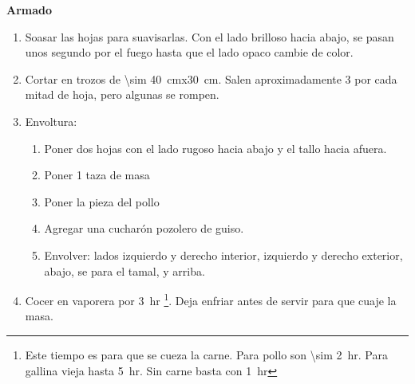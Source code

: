 \textbf{Armado}
\begin{enumerate}
\item Soasar las hojas para suavisarlas. Con el lado brilloso hacia abajo, se pasan unos segundo por el fuego hasta que el lado opaco cambie de color. 
\item Cortar en trozos de \SI{\sim 40}{cm}x\SI{30}{cm}. Salen aproximadamente 3 por cada mitad de hoja, pero algunas se rompen.
\item Envoltura:
\begin{enumerate}
\item Poner dos hojas con el lado rugoso hacia abajo y el tallo hacia afuera. 
\item Poner 1 taza de masa
\item Poner la pieza del pollo 
\item Agregar una cucharón pozolero de guiso.
\item Envolver: lados izquierdo y derecho interior, izquierdo y derecho exterior, abajo, se para el tamal, y arriba.
\end{enumerate}
\item Cocer en vaporera por \SI{3}{hr} \footnote{Este tiempo es para que se cueza la carne. Para pollo son \SI{\sim 2}{hr}. Para gallina vieja hasta \SI{5}{hr}. Sin carne basta con \SI{1}{hr}}. Deja enfriar antes de servir para que cuaje la masa.
\end{enumerate}
